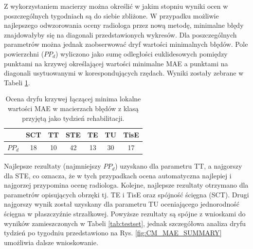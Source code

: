 Z wykorzystaniem macierzy można określić w jakim stopniu wyniki ocen w poszczególnych tygodniach są do siebie zbliżone. W przypadku możliwie najlepszego odwzorowania oceny radiologa przez nową metodę, minimalne błędy znajdowałyby się na diagonali przedstawionych wykresów. Dla poszczególnych parametrów można jednak zaobserwować dryf wartości minimalnych błędów. Pole powierzchni ($PP_d$) wyliczono jako sumę odległości euklidesowych pomiędzy punktami na krzywej określającej wartości minimalne MAE a punktami na diagonali usytuowanymi w korespondujących rzędach. Wyniki zostały zebrane w Tabeli \ref{tab:dryf_meas}. 
\vspace{10px} 
\begin{table}[h!]
	\caption{Ocena dryfu krzywej łączącej minima lokalne wartości MAE w macierzach błędów z klasą przyjętą jako tydzień rehabilitacji.}
	\begin{center}
		\begin{tabular}{l||c|c|c|c|c|c}
		
			& \textbf{SCT} & \textbf{TT} & \textbf{STE} & \textbf{TE} & \textbf{TU} & \textbf{TisE}\\ 
			\hline \hline
			$PP_d$ &18&10&42&13&30&17						
		\end{tabular}
	\end{center}
	\label{tab:dryf_meas}
\end{table}

\vspace{-10px}
Najlepsze rezultaty (najmniejszy $PP_d$) uzyskano dla parametru TT, a najgorszy dla STE, co oznacza, że w tych przypadkach ocena automatyczna najlepiej \linebreak i najgorzej przypomina ocenę radiologa. Kolejne, najlepsze rezultaty otrzymano dla parametrów opisujących obrzęki tj. TE i TisE oraz spójność ścięgna (SCT). Drugi najgorszy wynik został uzyskany dla parametru TU oceniającego jednorodność ścięgna w płaszczyźnie strzałkowej. Powyższe rezultaty są spójne z wnioskami \linebreak do wyników zamieszczonych w Tabeli \ref{tab:testset}, jednak szczegółowa analiza dryfu tydzień po tygodniu przedstawiono na Rys. \ref{fig:CM_MAE_SUMMARY} umożliwia dalsze wnioskowanie.

